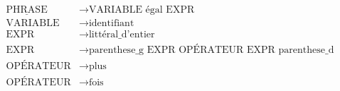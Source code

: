 \[
    \begin{aligned}
        \underline{\text{PHRASE}} & \to \text{VARIABLE \'egal EXPR} \\
        \text{VARIABLE}           & \to \text{identifiant} \\
        \text{EXPR}               & \to \text{litt\'eral\_d’entier}  \\
        \text{EXPR}               & \to \text{parenthese\_g EXPR OPÉRATEUR EXPR parenthese\_d}  \\
        \text{OPÉRATEUR}          & \to \text{plus} \\
        \text{OPÉRATEUR}          & \to \text{fois}
    \end{aligned}
\]
